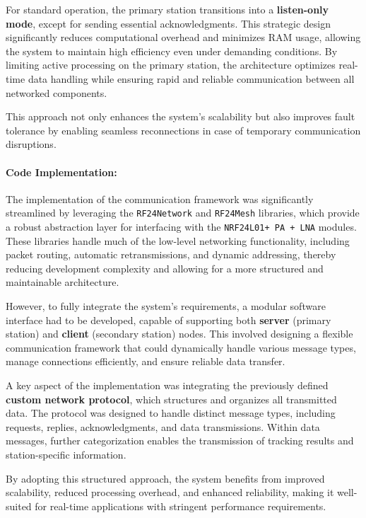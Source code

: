 For standard operation, the primary station transitions into a \textbf{listen-only mode}, except for sending essential acknowledgments. This strategic design significantly reduces computational overhead and minimizes RAM usage, allowing the system to maintain high efficiency even under demanding conditions. By limiting active processing on the primary station, the architecture optimizes real-time data handling while ensuring rapid and reliable communication between all networked components.  

This approach not only enhances the system's scalability but also improves fault tolerance by enabling seamless reconnections in case of temporary communication disruptions.  

\paragraph{Code Implementation:}  
The implementation of the communication framework was significantly streamlined by leveraging the \texttt{RF24Network} and \texttt{RF24Mesh} libraries, which provide a robust abstraction layer for interfacing with the \texttt{NRF24L01+ PA + LNA} modules. These libraries handle much of the low-level networking functionality, including packet routing, automatic retransmissions, and dynamic addressing, thereby reducing development complexity and allowing for a more structured and maintainable architecture.  

However, to fully integrate the system’s requirements, a modular software interface had to be developed, capable of supporting both \textbf{server} (primary station) and \textbf{client} (secondary station) nodes. This involved designing a flexible communication framework that could dynamically handle various message types, manage connections efficiently, and ensure reliable data transfer.  

A key aspect of the implementation was integrating the previously defined \textbf{custom network protocol}, which structures and organizes all transmitted data. The protocol was designed to handle distinct message types, including requests, replies, acknowledgments, and data transmissions. Within data messages, further categorization enables the transmission of tracking results and station-specific information.  

By adopting this structured approach, the system benefits from improved scalability, reduced processing overhead, and enhanced reliability, making it well-suited for real-time applications with stringent performance requirements.  

